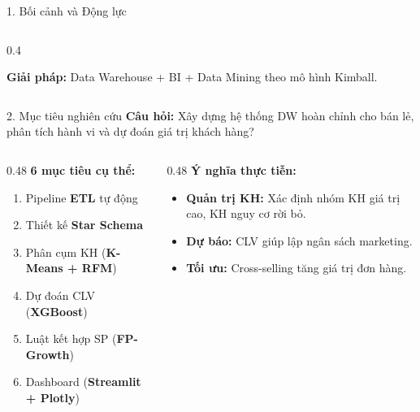 \documentclass[10pt, aspectratio=169]{beamer}
\begin{document}
\begin{frame}{1. Bối cảnh và Động lực}
\begin{columns}[T]
\begin{column}{0.4\textwidth}
\begin{center}
            \end{center}
            
            \vspace{0.1cm}
            \textbf{Giải pháp:} Data Warehouse + BI + Data Mining theo mô hình Kimball.
        \end{column}
    \end{columns}
\end{frame}

\begin{frame}{2. Mục tiêu nghiên cứu}
    \small
    \textbf{Câu hỏi:} Xây dựng hệ thống DW hoàn chỉnh cho bán lẻ, phân tích hành vi và dự đoán giá trị khách hàng?

    \vspace{0.2cm}
    \begin{columns}[T]
        \begin{column}{0.48\textwidth}
            \textbf{6 mục tiêu cụ thể:}
            \begin{enumerate}
                \item Pipeline \textbf{ETL} tự động
                \item Thiết kế \textbf{Star Schema}
                \item Phân cụm KH (\textbf{K-Means + RFM})
                \item Dự đoán CLV (\textbf{XGBoost})
                \item Luật kết hợp SP (\textbf{FP-Growth})
                \item Dashboard (\textbf{Streamlit + Plotly})
            \end{enumerate}
        \end{column}
        
        \begin{column}{0.48\textwidth}
            \textbf{Ý nghĩa thực tiễn:}
            \begin{itemize}
                \item \textbf{Quản trị KH:} Xác định nhóm KH giá trị cao, KH nguy cơ rời bỏ.
                \item \textbf{Dự báo:} CLV giúp lập ngân sách marketing.
                \item \textbf{Tối ưu:} Cross-selling tăng giá trị đơn hàng.
            \end{itemize}
        \end{column}
    \end{columns}
\end{frame}
\end{document}
